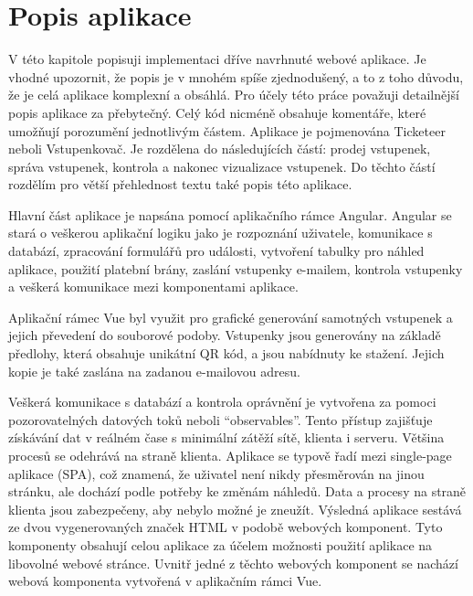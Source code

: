 \chapter{Popis aplikace}
V této kapitole popisuji implementaci dříve navrhnuté webové aplikace. Je vhodné upozornit, že popis je v mnohém spíše zjednodušený, a to z toho důvodu, že je celá aplikace komplexní a obsáhlá. Pro účely této práce považuji detailnější popis aplikace za přebytečný. Celý kód nicméně obsahuje komentáře, které umožňují porozumění jednotlivým částem. 
Aplikace je pojmenována Ticketeer neboli Vstupenkovač. Je rozdělena do následujících částí: prodej vstupenek, správa vstupenek, kontrola a nakonec vizualizace vstupenek. Do těchto částí rozdělím pro větší přehlednost textu také popis této aplikace.

Hlavní část aplikace je napsána pomocí aplikačního rámce Angular. Angular se stará o veškerou aplikační logiku jako je rozpoznání uživatele, komunikace s databází, zpracování formulářů pro události, vytvoření tabulky pro náhled aplikace, použití platební brány, zaslání vstupenky e-mailem, kontrola vstupenky a veškerá komunikace mezi komponentami aplikace.

Aplikační rámec Vue byl využit pro grafické generování samotných vstupenek a jejich převedení do souborové podoby. Vstupenky jsou generovány na základě předlohy, která obsahuje unikátní QR kód, a jsou nabídnuty ke stažení. Jejich kopie je také zaslána na zadanou e-mailovou adresu.

Veškerá komunikace s databází a kontrola oprávnění je vytvořena za pomoci pozorovatelných datových toků neboli “observables”. Tento přístup zajišťuje získávání dat v reálném čase s minimální zátěží sítě, klienta i serveru. Většina procesů se odehrává na straně klienta. Aplikace se typově řadí mezi single-page aplikace (SPA), což znamená, že uživatel není nikdy přesměrován na jinou stránku, ale dochází podle potřeby ke změnám náhledů. Data a procesy na straně klienta jsou zabezpečeny, aby nebylo možné je zneužít. Výsledná aplikace sestává ze dvou vygenerovaných značek HTML v podobě webových komponent. Tyto komponenty obsahují celou aplikace za účelem možnosti použití aplikace na libovolné webové stránce. Uvnitř jedné z těchto webových komponent se nachází webová komponenta vytvořená v aplikačním rámci Vue.

